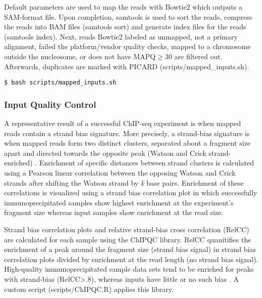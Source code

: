 \documentclass{article}
\begin{document}
\begin{sloppypar}
Default parameters are used to map the reads with Bowtie2 which outputs a SAM-format file. Upon completion, samtools is used to sort the reads, compress the reads into BAM files (samtools sort) and generate index files for the reads (samtools index).  Next, reads Bowtie2 labeled as unmapped, not a primary alignment, failed the platform/vendor quality checks, mapped to a chromosome outside the nucleosome, or does not have MAPQ$\geq$30 are filtered out. Afterwards, duplicates are marked with PICARD  ({\selectfont scripts/mapped\_inputs.sh}).

\begin{verbatim}
$ bash scripts/mapped_inputs.sh
\end{verbatim}

\subsubsection{Input Quality Control}

A representative result of a successful ChIP-seq experiment is when mapped reads contain a strand bias signature. More precisely, a strand-bias signature is when mapped reads form two distinct clusters, separated about a fragment size apart and  directed towards the opposite peak (Watson and Crick strand-enriched) \cite{Landt2012}. Enrichment of specific distances between strand clusters is calculated using a Pearson linear correlation between the opposing Watson and Crick strands after shifting the Watson strand by \textit{k} base pairs. Enrichment of these correlations is visualized using a strand bias correlation plot in which successfully immunoprecipitated samples show highest enrichment at the experiment's fragment size whereas input samples show enrichment at the read size. 


 Strand bias correlation plots and relative strand-bias cross correlation (RelCC) are calculated for each sample using the ChIPQC library. RelCC quanitifies the enrichment of a peak around the fragment size (strand bias signal) in strand bias correlation plots divided by enrichment at the read length (no strand bias signal).  High-quality immunoprecipitated sample data sets tend to be enriched for peaks with strand-bias (RelCC>.8), whereas inputs have little or no such bias \cite{Landt2012}. A custom script ({\selectfont scripts/ChIPQC.R}) applies this library. 
 

\end{sloppypar}
\end{document}
